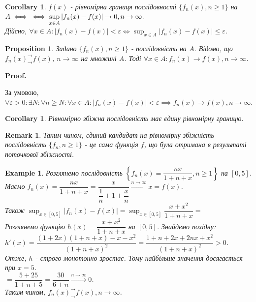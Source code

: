 \documentclass[a4paper, 10pt]{article}
\makeatletter
\def\huge{\displaystyle}
\def\qed{$\blacksquare$}
\theoremstyle{theoremdd}
\theoremstyle{theoremdd}
\theoremstyle{theoremdd}
\theoremstyle{theoremdd}
\theoremstyle{theoremdd}
\newtheorem{example}[theorem]{Example}
\theoremstyle{theoremdd}
\newtheorem{proposition}[theorem]{Proposition}
\theoremstyle{theoremdd}
\newtheorem{remark}[theorem]{Remark}
\theoremstyle{theoremdd}
\theoremstyle{theoremdd}
\newtheorem{corollary}[theorem]{Corollary}
\renewenvironment{proof}[1][Proof.\\]{\par
\pushQED{\hfill \qed}%
\normalfont \topsep6\p@\@plus6\p@\relax
\trivlist
\item\relax
{\bfseries
#1\@addpunct{.}}\hspace\labelsep\ignorespaces
}{%
\popQED\endtrivlist\@endpefalse
}
\makeatother
\begin{document}
\begin{corollary}
$f(x)$ - рівномірна границя послідовності $\{f_n(x), n \geq 1\}$ на $A \iff \\ \iff \huge\sup_{x \in A} |f_n(x) - f(x)| \to 0, n \to \infty$.\\
\textit{Дійсно, $\forall x \in A: |f_n(x)-f(x)| < \varepsilon \iff \huge\sup_{x \in A} |f_n(x) - f(x)| \leq \varepsilon$}.
\end{corollary}

\begin{proposition}
Задано $\{f_n(x), n \geq 1\}$ - послідовність на $A$. Відомо, що $f_n(x)^\rightarrow_\rightarrow f(x)$, $n \to \infty$ на множині $A$. Тоді $\forall x \in A: f_n(x) \to f(x), n \to \infty$.
\end{proposition}

\begin{proof}
За умовою, $\forall \varepsilon > 0: \exists N: \forall n \geq N: \forall x \in A: |f_n(x) - f(x)| < \varepsilon \implies f_n(x) \to f(x), n \to \infty$.
\end{proof}

\begin{corollary}
Рівномірно збіжна послідовність має єдину рівномірну границю.
\end{corollary}

\begin{remark}
Таким чином, єдиний кандидат на рівномірну збіжність послідовність $\{f_n, n \geq 1\}$ - це сама функція $f$, що була отримана в результаті поточкової збіжності.
\end{remark}

\begin{example}
Розглянемо послідовність $\left\{ f_n(x) = \dfrac{nx}{1+n+x}, n \geq 1 \right\}$ на $[0,5]$.\\
Маємо $f_n(x) = \dfrac{nx}{1+n+x} = \dfrac{x}{\dfrac{1}{n}+ 1 + \dfrac{x}{n}} \overset{n \to \infty}{\longrightarrow} x = f(x)$.\\
Також $\huge\sup_{x \in [0,5]} |f_n(x) - f(x)| = \sup_{x \in [0,5]} \dfrac{x+x^2}{1+n+x} \boxed{=}$\\
Розглянемо функцію $h(x) = \dfrac{x+x^2}{1+n+x}$ на $[0,5]$. Знайдемо похідну:\\
$h'(x) = \dfrac{(1+2x)(1+n+x) - x-x^2}{(1+n+x)^2} = \dfrac{1+n+2x+2nx+x^2}{(1+n+x)^2} > 0$.\\
Отже, $h$ - строго монотонно зростає. Тому найбільше значення досягається при $x = 5$.\\
$\boxed{=} \dfrac{5+25}{1+n+5} = \dfrac{30}{6+n} \overset{n \to \infty}{\longrightarrow} 0$.\\
Таким чином, $f_n(x)^\rightarrow_\rightarrow f(x), n \to \infty$.
\end{example}
\end{document}
